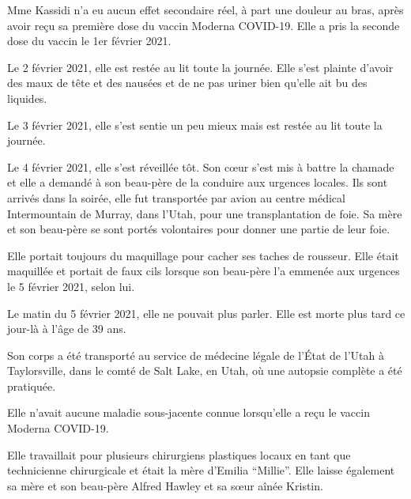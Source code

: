 Mme Kassidi n'a eu aucun effet secondaire réel, à part une douleur au bras,
après avoir reçu sa première dose du vaccin Moderna COVID-19. Elle a pris la
seconde dose du vaccin le 1er février 2021.

Le 2 février 2021, elle est restée au lit toute la journée. Elle s'est plainte
d'avoir des maux de tête et des nausées et de ne pas uriner bien qu'elle ait bu
des liquides.

Le 3 février 2021, elle s'est sentie un peu mieux mais est restée au lit toute
la journée.

Le 4 février 2021, elle s'est réveillée tôt. Son cœur s'est mis à battre la
chamade et elle a demandé à son beau-père de la conduire aux urgences
locales. Ils sont arrivés dans la soirée, elle fut transportée par avion au
centre médical Intermountain de Murray, dans l'Utah, pour une transplantation de
foie. Sa mère et son beau-père se sont portés volontaires pour donner une partie
de leur foie.

Elle portait toujours du maquillage pour cacher ses taches de rousseur. Elle
était maquillée et portait de faux cils lorsque son beau-père l'a emmenée aux
urgences le 5 février 2021, selon lui.

Le matin du 5 février 2021, elle ne pouvait plus parler. Elle est morte plus
tard ce jour-là à l'âge de 39 ans.

Son corps a été transporté au service de médecine légale de l'État de l'Utah à
Taylorsville, dans le comté de Salt Lake, en Utah, où une autopsie complète a
été pratiquée.

Elle n'avait aucune maladie sous-jacente connue lorsqu'elle a reçu le vaccin
Moderna COVID-19.

Elle travaillait pour plusieurs chirurgiens plastiques locaux en tant que
technicienne chirurgicale et était la mère d'Emilia “Millie”. Elle laisse
également sa mère et son beau-père Alfred Hawley et sa sœur aînée Kristin.

